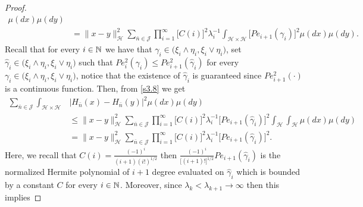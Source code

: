 \documentclass[review, onefignum, onetabnum]{siamart171218}
\begin{document}
\begin{proof}
\begin{equation}
\begin{aligned}
            \mu(dx)\mu(dy)
        \\
        &= 
        \| x-y\|_{\mathcal{H}}^2 
        \sum_{\bar n\in \mathcal{J}}  
            \prod_{i=1}^\infty   
                \Big[
                    C(i)
                \Big]^2 
                \lambda_i^{-1} 
                \int_{\mathcal{H}\times \mathcal{H}}  
                    \Big[
                        Pe_{i+1}(\gamma_i)
                    \Big]^2  
                \mu(dx)\mu(dy) .
    \end{aligned}
\end{equation}
Recall that for every $i\in{\mathbb N}$ we have that $\gamma_i\in 
\big(\xi_i\wedge\eta_i, \xi_i\vee \eta_i  \big)$, set $\hat \gamma_i
\in \big(\xi_i\wedge\eta_i, \xi_i\vee \eta_i  \big)$ such that 
$Pe_i^2(\gamma_i)\le Pe_{i+1}^2(\hat\gamma_i)$ for every 
$\gamma_i\in \big(\xi_i\wedge\eta_i, \xi_i\vee \eta_i  \big)$, notice that the 
existence of $\hat \gamma_i$ is 
guaranteed since $ Pe_{i+1}^2(\cdot)$ is a continuous function. Then, from 
\eqref{s3.8} we get
\begin{equation}
    \label{s3.9}
    \begin{aligned}
        \sum_{\bar n\in \mathcal{J}} 
        \int_{\mathcal{H}\times \mathcal{H}}  
        &
        \big| 
            H_{\bar n}(x) - H_{\bar n}(y) 
        \big|^2 
        \mu(dx)\mu(dy) 
        \\ 
        &\le 
        \| x-y\|_{\mathcal{H}}^2 
        \sum_{\bar n\in \mathcal{J}}  
            \prod_{i=1}^\infty   
            \Big[
                C(i)
            \Big]^2 
            \lambda_i^{-1} 
            \Big[
                Pe_{i+1}(\hat \gamma_i)
            \Big]^2 
            \int_{\mathcal{H}} 
            \int_{\mathcal{H}}
            \mu(dx)\mu(dy)
        \\
        &=  
        \| x-y\|_{\mathcal{H}}^2 
        \sum_{\bar n\in \mathcal{J}}
            \prod_{i=1}^\infty   
            \Big[
                C(i)
            \Big]^2 
            \lambda_i^{-1} 
            \Big[
                Pe_{i+1}(\hat \gamma_i)
            \Big]^2 .
    \end{aligned}
\end{equation}
Here, we recall that $C(i)=\frac{(-1)^i}{(i+1)(i!)^{1/2}} $ then  
$\frac{(-1)^i}{\big[(i+1)!\Big]^{1/2}} Pe_{i+1}(\hat \gamma_i)$ 
is the normalized Hermite polynomial of $i+1$ degree evaluated on $\hat 
\gamma_i$ which is bounded by a constant $C$ for every $i\in{\mathbb N}$. 
Moreover, since $\lambda_k<\lambda_{k+1}\rightarrow \infty $ then this implies 

\end{proof}
\end{document}
